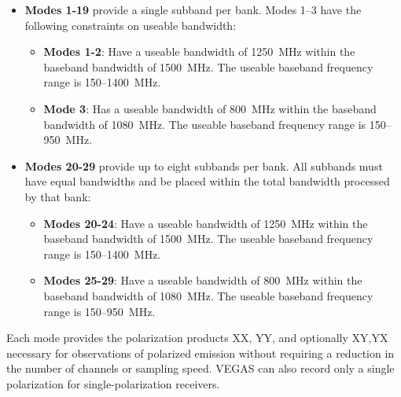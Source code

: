 \begin{itemize}[leftmargin=*]
\item {\bf Modes 1-19} provide a single subband per bank.  Modes 1--3 have the
following constraints on useable bandwidth:
\begin{itemize}
\item {\bf Modes 1-2}: Have a useable bandwidth of 1250~MHz within the baseband
bandwidth of 1500~MHz.  The useable baseband frequency range is 150--1400~MHz.
\item {\bf Mode 3}: Has a useable bandwidth of 800~MHz within the baseband
bandwidth of 1080~MHz.  The useable baseband frequency range is 150--950~MHz.
\end{itemize}
\item {\bf Modes 20-29} provide up to eight subbands per bank.  All subbands
must have equal bandwidths and be placed within the total bandwidth processed
by that bank:
\begin{itemize}
\item {\bf Modes 20-24}: Have a useable bandwidth of 1250~MHz within the baseband
bandwidth of 1500~MHz.  The useable baseband frequency range is 150--1400~MHz.
\item {\bf Modes 25-29}: Have a useable bandwidth of 800~MHz within the baseband
bandwidth of 1080~MHz.  The useable baseband frequency range is 150--950~MHz.
\end{itemize}
\end{itemize}

Each mode provides the polarization products XX, YY, and optionally XY,YX
necessary for observations of polarized emission without requiring a reduction
in the number of channels or sampling speed. VEGAS can also record only a single
polarization for single-polarization receivers.





